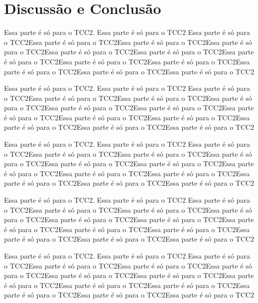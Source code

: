 \label{conclusao}
\section{Discussão e Conclusão}


Essa parte é só para o TCC2. Essa parte é só para o TCC2 Essa parte é só para o TCC2Essa parte é só para o TCC2Essa parte é só para o TCC2Essa parte é só para o TCC2Essa parte é só para o TCC2Essa parte é só para o TCC2Essa parte é só para o TCC2Essa parte é só para o TCC2Essa parte é só para o TCC2Essa parte é só para o TCC2Essa parte é só para o TCC2Essa parte é só para o TCC2


Essa parte é só para o TCC2. Essa parte é só para o TCC2 Essa parte é só para o TCC2Essa parte é só para o TCC2Essa parte é só para o TCC2Essa parte é só para o TCC2Essa parte é só para o TCC2Essa parte é só para o TCC2Essa parte é só para o TCC2Essa parte é só para o TCC2Essa parte é só para o TCC2Essa parte é só para o TCC2Essa parte é só para o TCC2Essa parte é só para o TCC2


Essa parte é só para o TCC2. Essa parte é só para o TCC2 Essa parte é só para o TCC2Essa parte é só para o TCC2Essa parte é só para o TCC2Essa parte é só para o TCC2Essa parte é só para o TCC2Essa parte é só para o TCC2Essa parte é só para o TCC2Essa parte é só para o TCC2Essa parte é só para o TCC2Essa parte é só para o TCC2Essa parte é só para o TCC2Essa parte é só para o TCC2


Essa parte é só para o TCC2. Essa parte é só para o TCC2 Essa parte é só para o TCC2Essa parte é só para o TCC2Essa parte é só para o TCC2Essa parte é só para o TCC2Essa parte é só para o TCC2Essa parte é só para o TCC2Essa parte é só para o TCC2Essa parte é só para o TCC2Essa parte é só para o TCC2Essa parte é só para o TCC2Essa parte é só para o TCC2Essa parte é só para o TCC2


Essa parte é só para o TCC2. Essa parte é só para o TCC2 Essa parte é só para o TCC2Essa parte é só para o TCC2Essa parte é só para o TCC2Essa parte é só para o TCC2Essa parte é só para o TCC2Essa parte é só para o TCC2Essa parte é só para o TCC2Essa parte é só para o TCC2Essa parte é só para o TCC2Essa parte é só para o TCC2Essa parte é só para o TCC2Essa parte é só para o TCC2

